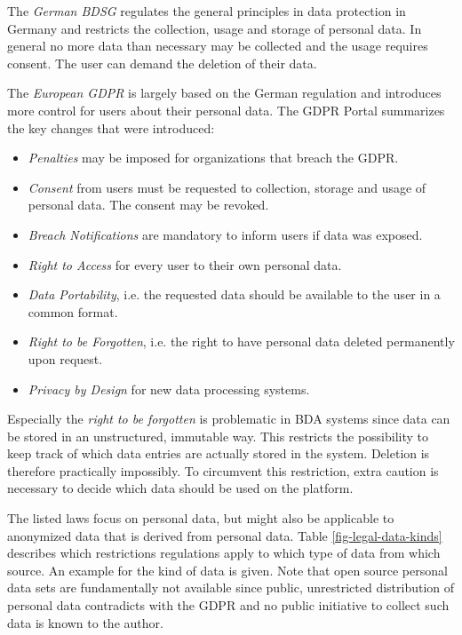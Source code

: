 The \emph{German \ac{BDSG}} regulates the general principles in data protection in Germany 
and restricts the collection, usage and storage of personal data.
In general no more data than necessary may be collected and the usage requires consent. 
The user can demand the deletion of their data.
\autocite[][§1ff., §12ff.]{bmjv2009bdsg}

The \emph{European \ac{GDPR}} is largely based
on the German regulation and introduces more control for users about their personal data.
\autocite{eu2016gdpr}
The \ac{GDPR} Portal \autocite{trunomi2018gdpr} summarizes the key changes that were introduced:
\begin{itemize}
    \item \emph{Penalties} may be imposed for organizations that breach the \ac{GDPR}.
    \item \emph{Consent} from users must be requested to collection, storage and usage of personal data. The consent may be revoked.
    \item \emph{Breach Notifications} are mandatory to inform users if data was exposed.
    \item \emph{Right to Access} for every user to their own personal data.
    \item \emph{Data Portability}, i.e. the requested data should be available to the user in a common format.
    \item \emph{Right to be Forgotten}, i.e. the right to have personal data deleted permanently upon request.
    \item \emph{Privacy by Design} for new data processing systems.
\end{itemize}

Especially the \emph{right to be forgotten} is problematic in \ac{BDA} systems
since data can be stored in an unstructured, immutable way. 
This restricts the possibility to keep track of which data entries are actually stored in the system. Deletion is therefore practically impossibly. 
To circumvent this restriction, extra caution is necessary to decide which data should be used on the platform. 

The listed laws focus on personal data, but might also be applicable to anonymized data that is derived from personal data.
Table \ref{fig-legal-data-kinds} describes which restrictions regulations apply to which type of data from which source. 
An example for the kind of data is given.
Note that open source personal data sets are fundamentally not available 
since public, unrestricted distribution of personal data contradicts with the \ac{GDPR}
and no public initiative to collect such data is known to the author.

